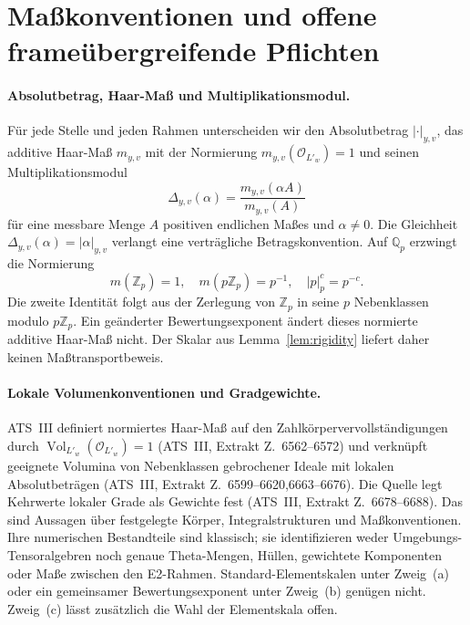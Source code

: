 \documentclass[11pt,a4paper]{article}
\theoremstyle{definition}
\theoremstyle{plain}
\theoremstyle{definition}
\newcommand{\Vol}{\operatorname{Vol}}
\newcommand{\anchor}[2]{(#1, Extrakt Z.~#2)}
\begin{document}
\section{Maßkonventionen und offene frameübergreifende Pflichten}
\label{sec:measure}

\paragraph{Absolutbetrag, Haar-Maß und Multiplikationsmodul.}
Für jede Stelle und jeden Rahmen unterscheiden wir den Absolutbetrag
$|\cdot|_{y,v}$, das additive Haar-Maß $m_{y,v}$ mit der Normierung
$m_{y,v}(\mathcal O_{L'_w})=1$ und seinen Multiplikationsmodul
\[
 \Delta_{y,v}(\alpha)=\frac{m_{y,v}(\alpha A)}{m_{y,v}(A)}
\]
für eine messbare Menge $A$ positiven endlichen Maßes und $\alpha\ne0$.
Die Gleichheit $\Delta_{y,v}(\alpha)=|\alpha|_{y,v}$ verlangt eine
verträgliche Betragskonvention. Auf $\mathbb Q_p$ erzwingt die Normierung
\[
 m(\mathbb Z_p)=1,\quad m(p\mathbb Z_p)=p^{-1},\quad |p|_p^c=p^{-c}.
\]
Die zweite Identität folgt aus der Zerlegung von $\mathbb Z_p$ in seine
$p$ Nebenklassen modulo $p\mathbb Z_p$. Ein geänderter Bewertungsexponent
ändert dieses normierte additive Haar-Maß nicht.
Der Skalar aus Lemma~\ref{lem:rigidity} liefert daher keinen
Maßtransportbeweis.

\paragraph{Lokale Volumenkonventionen und Gradgewichte.}
ATS~III definiert normiertes Haar-Maß auf den Zahlkörpervervollständigungen
durch $\Vol_{L'_w}(\mathcal O_{L'_w})=1$
\anchor{ATS~III}{6562--6572} und verknüpft geeignete Volumina von
Nebenklassen gebrochener Ideale mit lokalen Absolutbeträgen
\anchor{ATS~III}{6599--6620,6663--6676}.
Die Quelle legt Kehrwerte lokaler Grade als Gewichte fest
\anchor{ATS~III}{6678--6688}.
Das sind Aussagen über festgelegte Körper, Integralstrukturen und
Maßkonventionen. Ihre numerischen Bestandteile sind klassisch; sie
identifizieren weder Umgebungs-Tensoralgebren noch genaue Theta-Mengen,
Hüllen, gewichtete Komponenten oder Maße zwischen den E2-Rahmen.
Standard-Elementskalen unter Zweig~(a) oder ein gemeinsamer
Bewertungsexponent unter Zweig~(b) genügen nicht.
Zweig~(c) lässt zusätzlich die Wahl der Elementskala offen.
\end{document}
